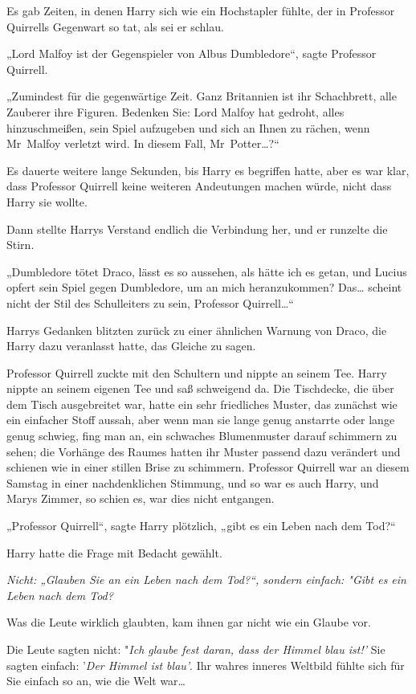 {Es gab Zeiten, in denen Harry sich wie ein Hochstapler fühlte, der in Professor Quirrells Gegenwart so tat, als sei er schlau.

„Lord Malfoy ist der Gegenspieler von Albus Dumbledore“, sagte Professor Quirrell.

„Zumindest für die gegenwärtige Zeit. Ganz Britannien ist ihr Schachbrett, alle Zauberer ihre Figuren. Bedenken Sie: Lord Malfoy hat gedroht, alles hinzuschmeißen, sein Spiel aufzugeben und sich an Ihnen zu rächen, wenn Mr~Malfoy verletzt wird. In diesem Fall, Mr~Potter…?“

Es dauerte weitere lange Sekunden, bis Harry es begriffen hatte, aber es war klar, dass Professor Quirrell keine weiteren Andeutungen machen würde, nicht dass Harry sie wollte.

Dann stellte Harrys Verstand endlich die Verbindung her, und er runzelte die Stirn.

„Dumbledore tötet Draco, lässt es so aussehen, als hätte ich es getan, und Lucius opfert sein Spiel gegen Dumbledore, um an mich heranzukommen? Das… scheint nicht der Stil des Schulleiters zu sein, Professor Quirrell…“

Harrys Gedanken blitzten zurück zu einer ähnlichen Warnung von Draco, die Harry dazu veranlasst hatte, das Gleiche zu sagen.

Professor Quirrell zuckte mit den Schultern und nippte an seinem Tee. Harry nippte an seinem eigenen Tee und saß schweigend da. Die Tischdecke, die über dem Tisch ausgebreitet war, hatte ein sehr friedliches Muster, das zunächst wie ein einfacher Stoff aussah, aber wenn man sie lange genug anstarrte oder lange genug schwieg, fing man an, ein schwaches Blumenmuster darauf schimmern zu sehen; die Vorhänge des Raumes hatten ihr Muster passend dazu verändert und schienen wie in einer stillen Brise zu schimmern. Professor Quirrell war an diesem Samstag in einer nachdenklichen Stimmung, und so war es auch Harry, und Marys Zimmer, so schien es, war dies nicht entgangen.

„Professor Quirrell“, sagte Harry plötzlich, „gibt es ein Leben nach dem Tod?“

Harry hatte die Frage mit Bedacht gewählt.

\emph{Nicht: „Glauben Sie an ein Leben nach dem Tod?“, sondern einfach: "Gibt es ein Leben nach dem Tod?}

Was die Leute wirklich glaubten, kam ihnen gar nicht wie ein Glaube vor.

Die Leute sagten nicht: "\emph{Ich glaube fest daran, dass der Himmel blau ist!'} Sie sagten einfach: '\emph{Der Himmel ist blau'}. Ihr wahres inneres Weltbild fühlte sich für Sie einfach so an, wie die Welt war…

}
